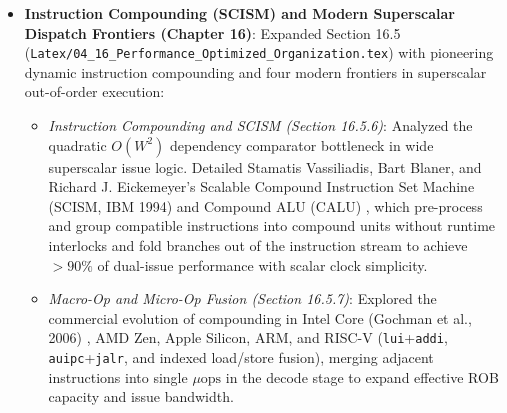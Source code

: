 \begin{itemize}
\begin{itemize}
        \item \textit{Mathematical Range Typography Standardization}: Replaced 22 non-standard instances across Chapters 12 and 16 where the division symbol ($\div$) was erroneously used for numeric ranges (e.g., $1\,\text{TB} \div 30\,\text{TB}$) with proper LaTeX en-dashes ($1\text{--}30\,\text{TB}$), while strictly preserving genuine arithmetic division operators.
        \item \textit{Cache Architecture Consolidation (Chapters 13 \& 16)}: Removed redundant Section 13.3 (``Cache Memories'') from Chapter 13 (\texttt{Latex/03\_13\_harvard\_5-OS.tex}), consolidating comprehensive cache microarchitecture into Section 16.7.3 while citing Maurice Wilkes' 1965 slave memories \cite{wilkes1965slave} and the IBM System/360 Model 85 \cite{liptay1968cache}.
        \item \textit{ToyRISC Modular Organization (Chapters 13 \& 17)}: Commented out Section 13.5 (``ToyRISC Processor'') in Chapter 13 to eliminate duplication with Chapter \ref{toyRiscDesign} (ToyRISC Design), preserving all original text and figures in source comments, and added an introductory reference paragraph under ``How an Instruction Set Architecture is Designed'' directing readers to Chapter \ref{toyRiscDesign}.
    \end{itemize}
    \item \textbf{Instruction Compounding (SCISM) and Modern Superscalar Dispatch Frontiers (Chapter 16)}: Expanded Section 16.5 (\texttt{Latex/04\_16\_Performance\_Optimized\_Organization.tex}) with pioneering dynamic instruction compounding and four modern frontiers in superscalar out-of-order execution:
    \begin{itemize}
        \item \textit{Instruction Compounding and SCISM (Section 16.5.6)}: Analyzed the quadratic $O(W^2)$ dependency comparator bottleneck in wide superscalar issue logic. Detailed Stamatis Vassiliadis, Bart Blaner, and Richard J. Eickemeyer's Scalable Compound Instruction Set Machine (SCISM, IBM 1994) \cite{vassiliadis1994scism} and Compound ALU (CALU) \cite{vassiliadis1993calu}, which pre-process and group compatible instructions into compound units without runtime interlocks and fold branches out of the instruction stream to achieve $>90\%$ of dual-issue performance with scalar clock simplicity.
        \item \textit{Macro-Op and Micro-Op Fusion (Section 16.5.7)}: Explored the commercial evolution of compounding in Intel Core (Gochman et al., 2006) \cite{gochman2006intel}, AMD Zen, Apple Silicon, ARM, and RISC-V (\texttt{lui}+\texttt{addi}, \texttt{auipc}+\texttt{jalr}, and indexed load/store fusion), merging adjacent instructions into single $\mu\text{ops}$ in the decode stage to expand effective ROB capacity and issue bandwidth.

\end{itemize}
\end{itemize}
